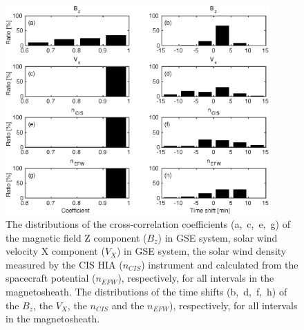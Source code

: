 \documentclass[draft]{agujournal2019}
\begin{document}
\pagebreak

\begin{figure}[h]
\centering
\includegraphics[width=0.9\textwidth,angle=0]{swe-2021SW002807-f10}
\caption{The distributions of the cross-correlation coefficients (a,~c,~e,~g) of the magnetic field Z component ($B_z$) in GSE system, solar wind velocity X component ($V_X$) in GSE system, the solar wind density measured by the CIS HIA ($n_{CIS}$) instrument and calculated from the spacecraft potential ($n_{EFW}$), respectively, for all intervals in the magnetosheath. The distributions of the time shifts (b,~d,~f,~h) of the $B_z$, the $V_X$, the $n_{CIS}$ and the $n_{EFW}$), respectively, for all intervals in the magnetosheath.}
\label{fig:mshcorrplot}
\end{figure}

\pagebreak
\end{document}
